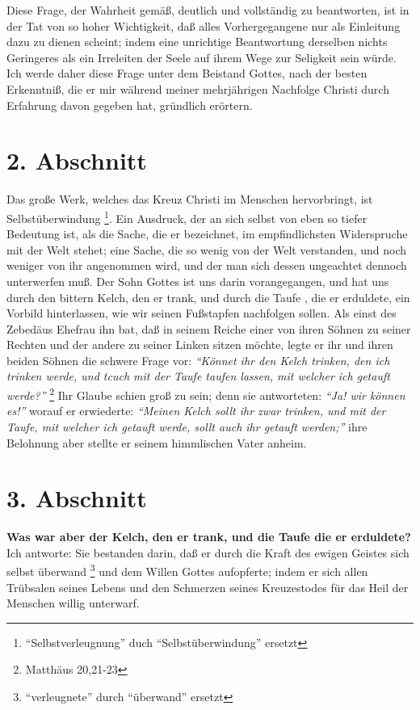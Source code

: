 Diese Frage, der Wahrheit gemäß, deutlich und vollständig zu beantworten, ist in
der Tat von so hoher Wichtigkeit, daß alles Vorhergegangene nur als Einleitung
dazu zu dienen scheint; indem eine unrichtige Beantwortung derselben nichts
Geringeres als ein Irreleiten der Seele auf ihrem Wege zur Seligkeit sein würde.
Ich werde daher diese Frage unter dem Beistand Gottes, nach der besten
Erkenntniß, die er mir während meiner mehrjährigen Nachfolge Christi durch
Erfahrung davon gegeben hat, gründlich erörtern.

\section{2. Abschnitt} \label{kap4_ab2}

Das große Werk, welches das Kreuz Christi im Menschen hervorbringt, ist
Selbstüberwindung \footnote{"`Selbstverleugnung"' duch "`Selbstüberwindung"'
ersetzt}. Ein Ausdruck, der an sich selbst von eben so tiefer Bedeutung
ist, als die Sache, die er bezeichnet, im empfindlichsten Widerspruche mit der
Welt stehet; eine Sache, die so wenig von der Welt verstanden, und noch weniger
von ihr angenommen wird, und der man sich dessen ungeachtet dennoch unterwerfen
muß. Der Sohn Gottes ist uns darin vorangegangen, und hat uns durch den bittern
Kelch, den er trank, und durch die Taufe , die er erduldete, ein
Vorbild
hinterlassen, wie wir seinen Fußstapfen nachfolgen sollen. Als einst des
Zebedäus Ehefrau  ihn bat, daß in seinem
Reiche einer von ihren Söhnen zu
seiner Rechten und der andere zu seiner Linken sitzen möchte, legte er ihr und
ihren beiden Söhnen die schwere Frage vor:
\textit{"`Könnet ihr den Kelch trinken, den
ich trinken werde, und tcuch mit der Taufe taufen lassen, mit welcher ich
getauft werde?"'}
\footnote{Matthäus  20,21-23}
Ihr Glaube schien groß zu sein; denn
sie antworteten:\textit{ "`Ja! wir können es!"'} worauf er erwiederte:
  \textit{"`Meinen Kelch
sollt ihr zwar trinken, und mit der Taufe, mit welcher ich getauft werde, sollt
auch ihr getauft werden;"'} ihre Belohnung aber stellte er seinem himmlischen
Vater anheim.

\section{3. Abschnitt} \label{kap4_ab3}

 
\textbf{Was war aber der Kelch, den er trank, und die Taufe die er erduldete?}
Ich
antworte: Sie bestanden darin, daß er durch die Kraft des ewigen Geistes sich
selbst überwand \footnote{"`verleugnete"' durch "`überwand"' ersetzt} und dem
Willen Gottes aufopferte; indem er sich allen
Trübsalen seines Lebens und den Schmerzen seines Kreuzestodes für das Heil der
Menschen willig unterwarf.

